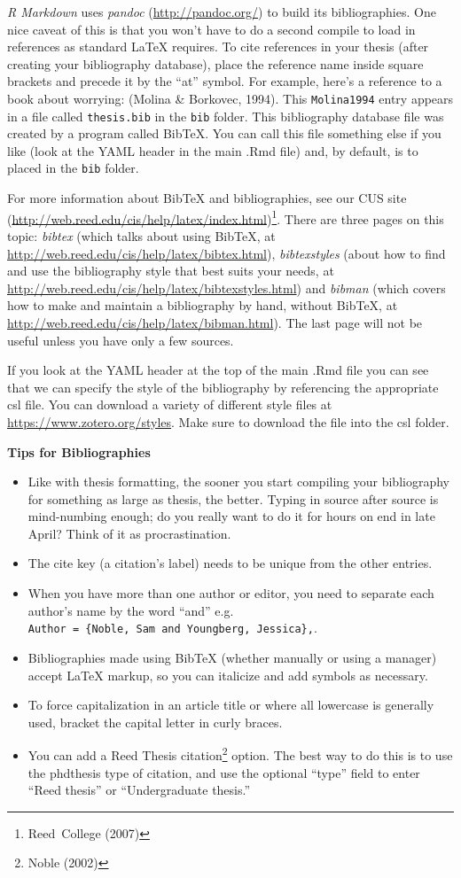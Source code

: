 \documentclass[12pt,twoside]{Mactemplate}
\providecommand{\tightlist}{%
  \setlength{\itemsep}{0pt}\setlength{\parskip}{0pt}}
\theoremstyle{definition}
\theoremstyle{definition}
\theoremstyle{definition}
\theoremstyle{remark}
\begin{document}
\emph{R Markdown} uses \emph{pandoc} (\url{http://pandoc.org/}) to build
its bibliographies. One nice caveat of this is that you won't have to do
a second compile to load in references as standard LaTeX requires. To
cite references in your thesis (after creating your bibliography
database), place the reference name inside square brackets and precede
it by the ``at'' symbol. For example, here's a reference to a book about
worrying: (Molina \& Borkovec, 1994). This \texttt{Molina1994} entry
appears in a file called \texttt{thesis.bib} in the \texttt{bib} folder.
This bibliography database file was created by a program called BibTeX.
You can call this file something else if you like (look at the YAML
header in the main .Rmd file) and, by default, is to placed in the
\texttt{bib} folder.

For more information about BibTeX and bibliographies, see our CUS site
(\url{http://web.reed.edu/cis/help/latex/index.html})\footnote{Reed~College
  (2007)}. There are three pages on this topic: \emph{bibtex} (which
talks about using BibTeX, at
\url{http://web.reed.edu/cis/help/latex/bibtex.html}),
\emph{bibtexstyles} (about how to find and use the bibliography style
that best suits your needs, at
\url{http://web.reed.edu/cis/help/latex/bibtexstyles.html}) and
\emph{bibman} (which covers how to make and maintain a bibliography by
hand, without BibTeX, at
\url{http://web.reed.edu/cis/help/latex/bibman.html}). The last page
will not be useful unless you have only a few sources.

If you look at the YAML header at the top of the main .Rmd file you can
see that we can specify the style of the bibliography by referencing the
appropriate csl file. You can download a variety of different style
files at \url{https://www.zotero.org/styles}. Make sure to download the
file into the csl folder.

\textbf{Tips for Bibliographies}
\begin{itemize}
\tightlist
\item
  Like with thesis formatting, the sooner you start compiling your
  bibliography for something as large as thesis, the better. Typing in
  source after source is mind-numbing enough; do you really want to do
  it for hours on end in late April? Think of it as procrastination.
\item
  The cite key (a citation's label) needs to be unique from the other
  entries.
\item
  When you have more than one author or editor, you need to separate
  each author's name by the word ``and'' e.g.
  \texttt{Author\ =\ \{Noble,\ Sam\ and\ Youngberg,\ Jessica\},}.
\item
  Bibliographies made using BibTeX (whether manually or using a manager)
  accept LaTeX markup, so you can italicize and add symbols as
  necessary.
\item
  To force capitalization in an article title or where all lowercase is
  generally used, bracket the capital letter in curly braces.
\item
  You can add a Reed Thesis citation\footnote{Noble (2002)} option. The
  best way to do this is to use the phdthesis type of citation, and use
  the optional ``type'' field to enter ``Reed thesis'' or
  ``Undergraduate thesis.''
\end{itemize}
\end{document}
